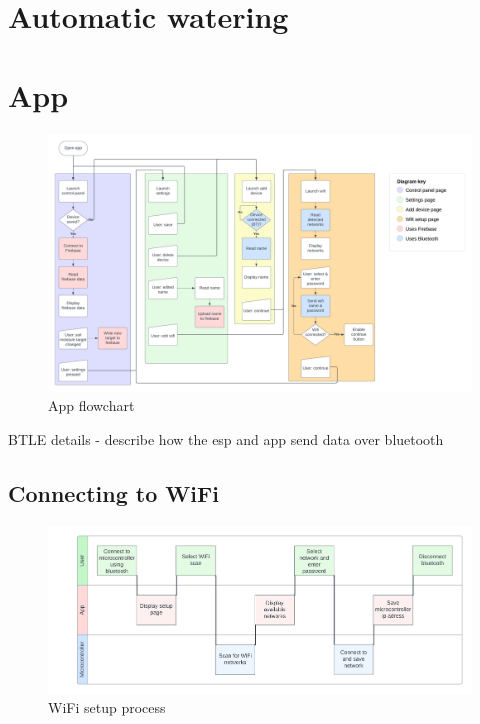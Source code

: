 \section{Automatic watering}

\section{App}

\begin{figure}[!h]
    \centering
    \includegraphics[width= \textwidth]{Report/detail_design/fig/app_flow_detailed.png}
    \caption{App flowchart}
    \label{fig:app_flow_detailed}
\end{figure}

BTLE details - describe how the esp and app send data over bluetooth

\subsection{Connecting to WiFi}
\begin{figure}[!h]
    \centering
    \includegraphics[width= \textwidth]{Report/detail_design/fig/wifi_connect.png}
    \caption{WiFi setup process}
    \label{fig:wifi_setup}
\end{figure}

